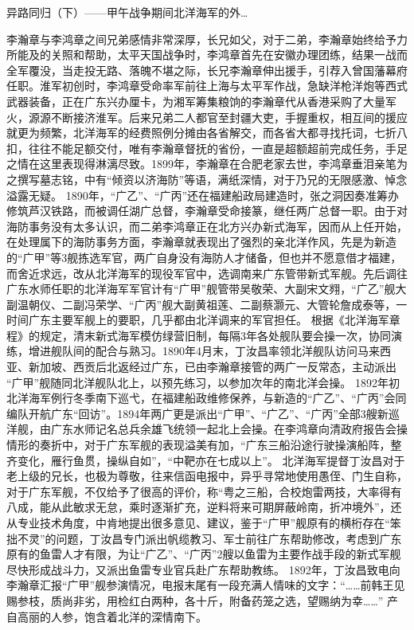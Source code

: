 \documentclass[12pt,UTF8]{ctexbook}
\begin{document}
异路同归（下）——甲午战争期间北洋海军的外…

李瀚章与李鸿章之间兄弟感情非常深厚，长兄如父，对于二弟，李瀚章始终给予力所能及的关照和帮助，太平天国战争时，李鸿章首先在安徽办理团练，结果一战而全军覆没，当走投无路、落魄不堪之际，长兄李瀚章伸出援手，引荐入曾国藩幕府任职。淮军初创时，李鸿章受命率军前往上海与太平军作战，急缺洋枪洋炮等西式武器装备，正在广东兴办厘卡，为湘军筹集粮饷的李瀚章代从香港采购了大量军火，源源不断接济淮军。后来兄弟二人都官至封疆大吏，手握重权，相互间的援应就更为频繁，北洋海军的经费照例分摊由各省解交，而各省大都寻找托词，七折八扣，往往不能足额交付，唯有李瀚章督抚的省份，一直是超额超前完成任务，手足之情在这里表现得淋漓尽致。1899年，李瀚章在合肥老家去世，李鸿章垂泪亲笔为之撰写墓志铭，中有“倾资以济海防”等语，满纸深情，对于乃兄的无限感激、悼念溢露无疑。
1890年，“广乙”、“广丙”还在福建船政局建造时，张之洞因奏准筹办修筑芦汉铁路，而被调任湖广总督，李瀚章受命接篆，继任两广总督一职。由于对海防事务没有太多认识，而二弟李鸿章正在北方兴办新式海军，因而从上任开始，在处理属下的海防事务方面，李瀚章就表现出了强烈的亲北洋作风，先是为新造的“广甲”等3舰拣选军官，两广自身没有海防人才储备，但也并不愿意借才福建，而舍近求远，改从北洋海军的现役军官中，选调南来广东管带新式军舰。先后调往广东水师任职的北洋海军军官计有“广甲”舰管带吴敬荣、大副宋文翙，“广乙”舰大副温朝仪、二副冯荣学、“广丙”舰大副黄祖莲、二副蔡灏元、大管轮詹成泰等，一时间广东主要军舰上的要职，几乎都由北洋调来的军官担任。
根据《北洋海军章程》的规定，清末新式海军模仿绿营旧制，每隔3年各处舰队要会操一次，协同演练，增进舰队间的配合与熟习。1890年4月末，丁汝昌率领北洋舰队访问马来西亚、新加坡、西贡后北返经过广东，已由李瀚章接管的两广一反常态，主动派出 “广甲”舰随同北洋舰队北上，以预先练习，以参加次年的南北洋会操。 1892年初北洋海军例行冬季南下巡弋，在福建船政维修保养，与新造的“广乙”、“广丙”会同编队开航广东“回访”。1894年两广更是派出“广甲”、“广乙”、“广丙”全部3艘新巡洋舰，由广东水师记名总兵余雄飞统领一起北上会操。在李鸿章向清政府报告会操情形的奏折中，对于广东军舰的表现溢美有加，“广东三船沿途行驶操演船阵，整齐变化，雁行鱼贯，操纵自如”，“中靶亦在七成以上”。 北洋海军提督丁汝昌对于老上级的兄长，也极为尊敬，往来信函电报中，异乎寻常地使用愚侄、门生自称，对于广东军舰，不仅给予了很高的评价，称“粤之三船，合校炮雷两技，大率得有八成，能从此敏求无怠，乘时逐渐扩充，逆料将来可期屏蔽岭南，折冲境外”，还从专业技术角度，中肯地提出很多意见、建议，鉴于“广甲”舰原有的横桁存在“笨拙不灵”的问题，丁汝昌专门派出帆缆教习、军士前往广东帮助修改，考虑到广东原有的鱼雷人才有限，为让“广乙”、“广丙”2艘以鱼雷为主要作战手段的新式军舰尽快形成战斗力，又派出鱼雷专业官兵赴广东帮助教练。 1892年，丁汝昌致电向李瀚章汇报“广甲”舰参演情况，电报末尾有一段充满人情味的文字：“……前韩王见赐参枝，质尚非劣，用检红白两种，各十斤，附备药笼之选，望赐纳为幸……” 产自高丽的人参，饱含着北洋的深情南下。
\end{document}
